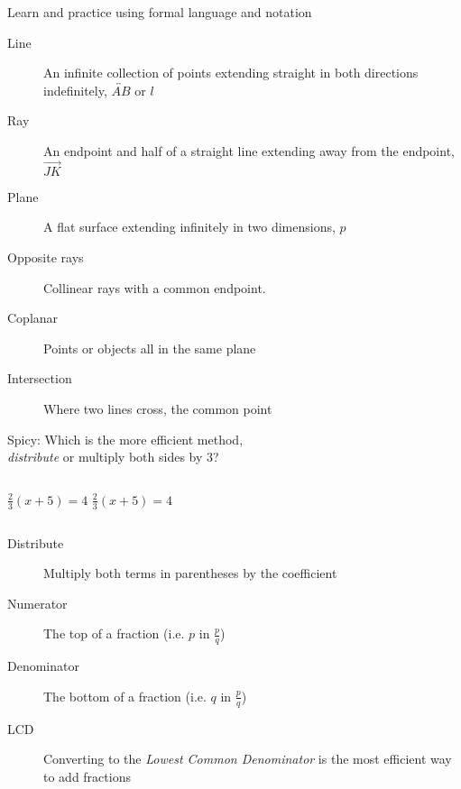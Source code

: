 \begin{frame}{Learn and practice using formal language and notation}
  \begin{description}%
    \item[Line] An infinite collection of points extending straight in both directions indefinitely, $\overleftrightarrow{AB}$ or $l$
    \item[Ray] An endpoint and half of a straight line extending away from the endpoint, $\overrightarrow{JK}$
    \item[Plane] A flat surface extending infinitely in two dimensions, $p$
    \item[Opposite rays] Collinear rays with a common endpoint. 
    \item[Coplanar] Points or objects all in the same plane
    \item[Intersection] Where two lines cross, the common point
  \end{description}
  \end{frame}

\begin{frame}{Spicy: Which is the more efficient method, \\ \qquad \emph{distribute} or multiply both sides by 3?}
  \begin{columns}[c]
     $\frac{2}{3}(x+5)=4$
     $\frac{2}{3}(x+5)=4$
  \end{columns} \vspace{3cm}
  \begin{description}
    \item[Distribute] Multiply both terms in parentheses by the coefficient
    \item[Numerator] The top of a fraction (i.e. $p$ in $\frac{p}{q}$)
    \item[Denominator] The bottom of a fraction (i.e. $q$ in $\frac{p}{q}$)
    \item[LCD] Converting to the \emph{Lowest Common Denominator} is the most efficient way to add fractions
  \end{description}
  \end{frame}

